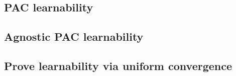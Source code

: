 \subsection{PAC learnability}


\subsection{Agnostic PAC learnability}


\subsection{Prove learnability via uniform convergence}


